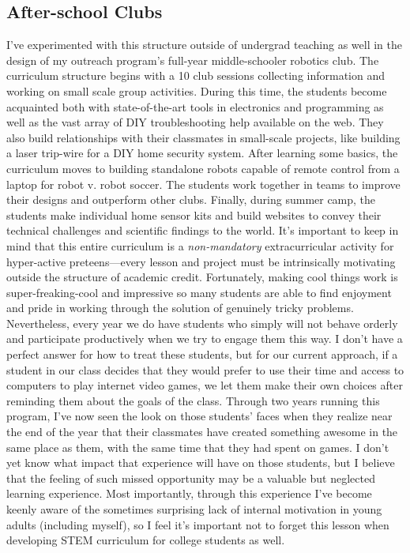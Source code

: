 \documentclass[12pt]{amsart} \usepackage{amssymb}
\begin{document}
\subsection*{After-school Clubs}
I've experimented with this structure outside of undergrad teaching as well in the design of my outreach program's full-year middle-schooler robotics club.   The curriculum structure begins with a 10 club sessions collecting information and working on small scale group activities.  During this time, the students become acquainted both with state-of-the-art tools in electronics and programming as well as the vast array of DIY troubleshooting help available on the web.  They also build relationships with their classmates in small-scale projects, like building a laser trip-wire for a DIY home security system.  After learning some basics, the curriculum moves to building standalone robots capable of remote control from a laptop for robot v. robot soccer. The students work together in teams to improve their designs and outperform other clubs. Finally, during summer camp, the students make individual home sensor kits and build websites to convey their technical challenges and scientific findings to the world.   It's important to keep in mind that this entire curriculum is a {\em non-mandatory} extracurricular activity for hyper-active preteens---every lesson and project must be intrinsically motivating outside the structure of academic credit.  Fortunately, making cool things work is super-freaking-cool and impressive so many students are able to find enjoyment and pride in working through the solution of genuinely tricky problems.  Nevertheless, every year we do have students who simply will not behave orderly and participate productively when we try to engage them this way.  I don't have a perfect answer for how to treat these students, but for our current approach, if a student in our class decides that they would prefer to use their time and access to computers to play internet video games, we let them make their own choices after reminding them about the goals of the class. Through two years running this program, I've now seen the look on those students' faces when they realize near the end of the year that their classmates have created something awesome in the same place as them, with the same time that they had spent on games.  I don't yet know what impact that experience will have on those students, but I believe that the feeling of such missed opportunity may be a valuable but neglected learning experience.  Most importantly, through this experience I've become keenly aware of the sometimes surprising lack of internal motivation in young adults (including myself), so I feel it's important not to forget this lesson when developing STEM curriculum for college students as well.
\end{document}
